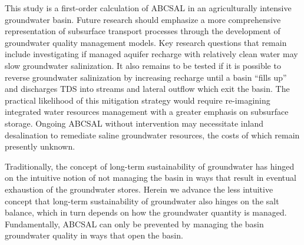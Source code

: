 This study is a first-order calculation of ABCSAL in an agriculturally intensive groundwater basin. Future research should emphasize a more comprehensive representation of subsurface transport processes through the development of groundwater quality management models. Key research questions that remain include investigating if managed aquifer recharge with relatively clean water may slow groundwater salinization. It also remains to be tested if it is possible to reverse groundwater salinization by increasing recharge until a basin ``fills up'' and discharges TDS into streams and lateral outflow which exit the basin. The practical likelihood of this mitigation strategy would require re-imagining integrated water resources management with a greater emphasis on subsurface storage. Ongoing ABCSAL without intervention may necessitate inland desalination to remediate saline groundwater resources, the costs of which remain presently unknown.  

Traditionally, the concept of long-term sustainability of groundwater has hinged on the intuitive notion of not managing the basin in ways that result in eventual exhaustion of the groundwater stores. Herein we advance the less intuitive concept that long-term sustainability of groundwater also hinges on the salt balance, which in turn depends on how the groundwater quantity is managed. Fundamentally, ABCSAL can only be prevented by managing the basin groundwater quality in ways that open the basin.  